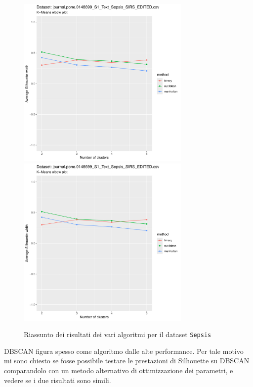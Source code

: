 \documentclass[a4paper, 12pt]{report}
\begin{document}
			\begin{figure}[H]
				\centering
				\includegraphics[width = 0.75\textwidth, height = 0.45\textheight, page = 9]{
					results/results_Sepsis.csv.pdf
				}
				\includegraphics[width = 0.75\textwidth, height = 0.45\textheight, page = 10]{
					results/results_Sepsis.csv.pdf
				}
				\caption{Riassunto dei risultati dei vari algoritmi per il dataset
				\texttt{Sepsis}}
				\label{fig:comp5}
			\end{figure}

			\clearpage

			DBSCAN figura spesso come algoritmo dalle alte performance.
			Per tale motivo mi sono chiesto se fosse possibile testare
			le prestazioni di Silhouette su DBSCAN comparandolo con un
			metodo alternativo di ottimizzazione dei parametri, e vedere
			se i due risultati sono simili.
\end{document}
